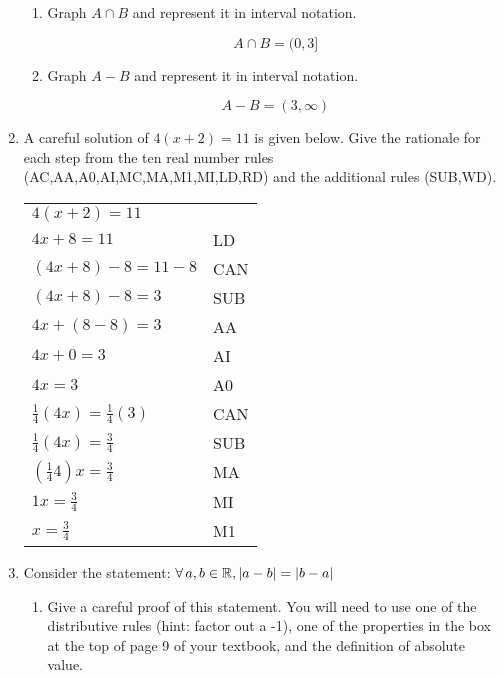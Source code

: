 \documentclass[letterpaper,12pt,fleqn]{article}
\begin{document}
\begin{enumerate}
\begin{enumerate}
\item Graph $A\cap B$ and represent it in interval notation.

  \[A\cap B=(0,3]\]

\item Graph $A-B$ and represent it in interval notation.

  \[A-B=(3,\infty)\]
\end{enumerate}

\item A careful solution of $4(x+2)=11$ is given below. Give the rationale for
each step from the ten real number rules (AC,AA,A0,AI,MC,MA,M1,MI,LD,RD) and
the additional rules (SUB,WD).

\begin{tabular}{ll}
$4(x+2)=11$ & \\
$4x+8=11$ & LD \\
$(4x+8)-8=11-8$ & CAN \\
$(4x+8)-8=3$ & SUB \\
$4x+(8-8)=3$ & AA \\
$4x+0=3$ & AI \\
$4x=3$ & A0 \\
$\frac{1}{4}(4x)=\frac{1}{4}(3)$ & CAN \\
$\frac{1}{4}(4x)=\frac{3}{4}$ & SUB \\
$(\frac{1}{4}4)x=\frac{3}{4}$ & MA \\
$1x=\frac{3}{4}$ & MI \\
$x=\frac{3}{4}$ & M1 \\
\end{tabular}

\bigskip

\item Consider the statement: $\forall\,a,b\in\mathbb{R},|a-b|=|b-a|$
  \begin{enumerate}
  \item Give a careful proof of this statement. You will need to use one of
    the distributive rules (hint: factor out a -1), one of the properties in
    the box at the top of page 9 of your textbook, and the definition of
    absolute value.


\end{enumerate}
\end{enumerate}
\end{document}

